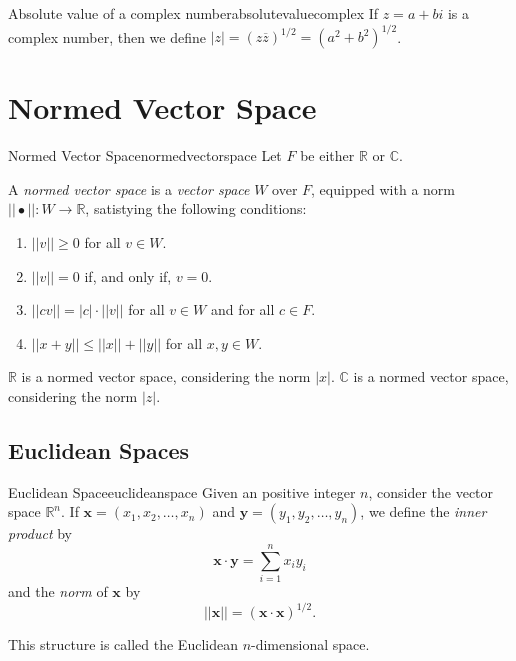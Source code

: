 \begin{defn}{Absolute value of a complex number}{absolutevaluecomplex}
	If \(z = a + bi\) is a complex number, then we define \(|z| = (z\overline z)^{1/2} = (a^2 + b^2)^{1/2}\).
\end{defn}

\section{Normed Vector Space}

\begin{defn}{Normed Vector Space}{normedvectorspace}
	Let \(F\) be either \(\mathbb{R}\) or \(\mathbb{C}\).

	A \emph{normed vector space} is a \emph{vector space} \(W\) over \(F\), equipped with a norm \(||\bullet||\colon W \to \mathbb{R}\), satistying the following conditions:
	\begin{enumerate}
		\item \(||v|| \geq 0\) for all \(v \in W\).
		\item \(||v|| = 0\) if, and only if, \(v = 0\).
		\item \(||cv|| = |c| \cdot ||v||\) for all \(v \in W\) and for all \(c \in F\).
		\item \(||x + y|| \leq ||x|| + ||y||\) for all \(x, y \in W\).
	\end{enumerate}
\end{defn}

\begin{exmp}{}{}
	\(\mathbb{R}\) is a normed vector space, considering the norm \(|x|\).
	\(\mathbb{C}\) is a normed vector space, considering the norm \(|z|\).
\end{exmp}

\subsection{Euclidean Spaces}

\begin{defn}{Euclidean Space}{euclideanspace}
	Given an positive integer \(n\), consider the vector space \(\mathbb{R}^n\).
	If \(\mathbf x = (x_1, x_2, \dots, x_n)\) and \(\mathbf y = (y_1, y_2, \dots, y_n)\), we define the \emph{inner product} by \[
		\mathbf x \cdot \mathbf y = \sum_{i=1}^n x_iy_i
	\]
	and the \emph{norm} of \(\mathbf x\) by \[
		||\mathbf x|| = (\mathbf x \cdot \mathbf x)^{1/2}.
	\]

	This structure is called the Euclidean \(n\)-dimensional space.
\end{defn}

